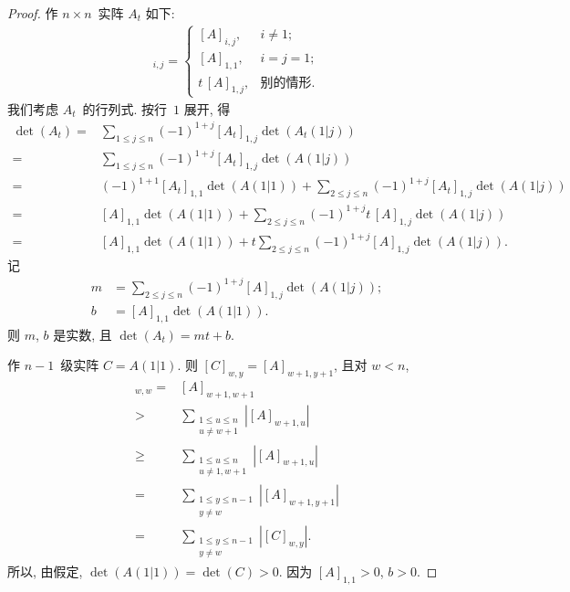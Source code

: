 \documentclass[../libro.tex]{subfiles}
\begin{document}
\begin{proof}
    作 \(n \times n\)~实阵 \(A_t\) 如下:
    \begin{align*}
        [A_t]_{i,j} =
        \begin{cases}
            [A]_{i,j},     & i \neq 1;    \\
            [A]_{1,1},     & i = j = 1;   \\
            t\, [A]_{1,j}, & \text{别的情形}.
        \end{cases}
    \end{align*}
    我们考虑 \(A_t\)~的行列式.
    按行~\(1\) 展开, 得
    \begin{align*}
        \det {(A_t)}
        = {} &
        \sum_{1 \leq j \leq n}
        {(-1)^{1 + j} [A_t]_{1,j} \det {(A_t (1 | j))}}
        \\
        = {} &
        \sum_{1 \leq j \leq n}
        {(-1)^{1 + j} [A_t]_{1,j} \det {(A (1 | j))}}
        \\
        = {} &
        (-1)^{1 + 1} [A_t]_{1,1} \det {(A (1 | 1))}
        +
        \sum_{2 \leq j \leq n}
        {(-1)^{1 + j} [A_t]_{1,j} \det {(A (1 | j))}}
        \\
        = {} &
        [A]_{1,1} \det {(A (1 | 1))}
        +
        \sum_{2 \leq j \leq n}
        {(-1)^{1 + j} t\, [A]_{1,j} \det {(A (1 | j))}}
        \\
        = {} &
        [A]_{1,1} \det {(A (1 | 1))}
        +
        t
        \sum_{2 \leq j \leq n}
        {(-1)^{1 + j} [A]_{1,j} \det {(A (1 | j))}}.
    \end{align*}
    记
    \begin{align*}
        m & =
        \sum_{2 \leq j \leq n}
        {(-1)^{1 + j} [A]_{1,j} \det {(A (1 | j))}};
        \\
        b & =
        [A]_{1,1} \det {(A (1 | 1))}.
    \end{align*}
    则 \(m\), \(b\) 是实数, 且
    \(\det {(A_t)} = mt + b\).

    作 \(n-1\)~级实阵 \(C = A(1 | 1)\).
    则 \([C]_{w,y} = [A]_{w+1,y+1}\),
    且对 \(w < n\),
    \begin{align*}
        [C]_{w,w}
        = {} &
        [A]_{w+1,w+1}
        \\
        > {} &
        \sum_{\substack{1 \leq u \leq n \\ u \neq w+1}}
        {|[A]_{w+1,u}|}
        \\
        \geq {} &
        \sum_{\substack{1 \leq u \leq n \\ u \neq 1, w+1}}
        {|[A]_{w+1,u}|}
        \\
        = {} &
        \sum_{\substack{1 \leq y \leq n-1 \\ y \neq w}}
        {|[A]_{w+1,y+1}|}
        \\
        = {} &
        \sum_{\substack{1 \leq y \leq n-1 \\ y \neq w}}
        {|[C]_{w,y}|}.
    \end{align*}
    所以, 由假定, \(\det {(A(1|1))} = \det {(C)} > 0\).
    因为 \([A]_{1,1} > 0\), \(b > 0\).


\end{proof}
\end{document}
